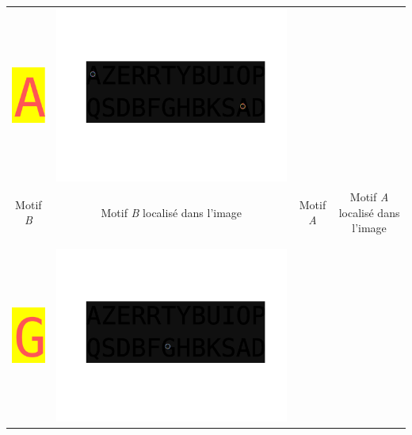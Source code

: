 \documentclass[a4paper,12pt,titlepage]{report}
\begin{document}
\begin{center}
\begin{tabular}{|cc|cc|}
			\includegraphics[scale=0.45]{../motif1.png} & \includegraphics[scale=0.15]{illus/motiflocal1.png}\\
			Motif \textit{B}  & Motif \textit{B} localisé dans l'image & 
			Motif \textit{A}  & Motif \textit{A} localisé dans l'image \\
			& & & \\
			\hline
			& & & \\
			\includegraphics[scale=0.45]{../motif2.png} & \includegraphics[scale=0.15]{illus/motiflocal2.png} &

\end{tabular}
\end{center}
\end{document}
